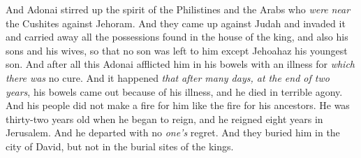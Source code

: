 \begin{biblechapter}
\verse And Adonai stirred up the spirit of the Philistines and the Arabs who \textit{were} \textit{near} the Cushites against Jehoram.
\verse And they came up against Judah and invaded it and carried away all the possessions found in the house of the king, and also his sons and his wives, so that no son was left to him except Jehoahaz his youngest son.
\verse And after all this Adonai afflicted him in his bowels with an illness for \textit{which there was} no cure.
\verse And it happened \textit{that} \textit{after many days, at the end of two years}, his bowels came out because of his illness, and he died in terrible agony. And his people did not make a fire for him like the fire for his ancestors.
\verse He was thirty-two years old when he began to reign, and he reigned eight years in Jerusalem. And he departed with no \textit{one’s} regret. And they buried him in the city of David, but not in the burial sites of the kings.
\end{biblechapter}

